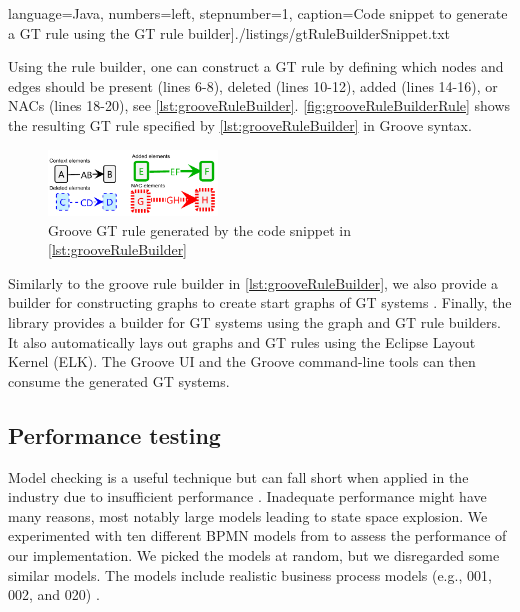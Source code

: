 \documentclass{lmcs} %
\begin{document}
 language=Java, numbers=left,
    stepnumber=1, caption=Code snippet to generate a GT rule using the GT rule builder]{./listings/gtRuleBuilderSnippet.txt}

Using the rule builder, one can construct a GT rule by defining which nodes and edges should be present (lines 6-8), deleted (lines 10-12), added (lines 14-16), or NACs (lines 18-20), see \autoref{lst:grooveRuleBuilder}.
\autoref{fig:grooveRuleBuilderRule} shows the resulting GT rule specified by \autoref{lst:grooveRuleBuilder} in Groove syntax.

\begin{figure}[ht]
    \centering
    \includegraphics[width=0.4\textwidth]{images/generated_rule.pdf}
    \caption{Groove GT rule generated by the code snippet in \autoref{lst:grooveRuleBuilder}}
    \label{fig:grooveRuleBuilderRule}
\end{figure}

Similarly to the groove rule builder in \autoref{lst:grooveRuleBuilder}, we also provide a builder for constructing graphs to create start graphs of GT systems \cite{timkrauterLMCS2024Artifacts2023}.
Finally, the library provides a builder for GT systems using the graph and GT rule builders.
It also automatically lays out graphs and GT rules using the Eclipse Layout Kernel (ELK).
The Groove UI and the Groove command-line tools can then consume the generated GT systems.

\subsection{Performance testing}

Model checking is a useful technique but can fall short when applied in the industry due to insufficient performance \cite{clarkeHandbookModelChecking2018}.
Inadequate performance might have many reasons, most notably large models leading to state space explosion.
We experimented with ten different BPMN models from \cite{houhouFirstOrderLogicVerification2022} to assess the performance of our implementation.
We picked the models at random, but we disregarded some similar models.
The models include realistic business process models (e.g., 001, 002, and 020) \cite{houhouFirstOrderLogicVerification2022}.
\end{document}
